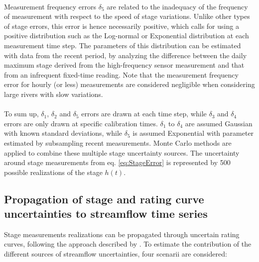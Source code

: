 \documentclass[11pt]{article}
\begin{document}
    \paragraph{}Measurement frequency errors $\delta_5$ are related to the inadequacy of the frequency of measurement with respect to the speed of stage variations. Unlike other types of stage errors, this error is hence necessarily positive, which calls for using a positive distribution such as the Log-normal or Exponential distribution at each measurement time step. The parameters of this distribution can be estimated with data from the recent period, by analyzing the difference between the daily maximum stage derived from the high-frequency sensor measurement and that from an infrequent fixed-time reading. Note that the measurement frequency error for hourly (or less) measurements are considered negligible when considering large rivers with slow variations. 
      
    \paragraph{}
    To sum up, $\delta_1$, $\delta_2$ and $\delta_5$ errors are drawn at each time step, while $\delta_3$ and $\delta_4$ errors are only drawn at specific calibration times. $\delta_1$ to $\delta_4$ are assumed Gaussian with known standard deviations, while $\delta_5$ is assumed Exponential with parameter estimated by subsampling recent measurements. Monte Carlo methods are applied to combine these multiple stage uncertainty sources. The uncertainty around stage measurements from eq. \ref{eq:StageError} is represented by 500 possible realizations of the stage $h(t)$.
   
   \subsection{Propagation of stage and rating curve uncertainties to streamflow time series}
   
   Stage measurements realizations can be propagated through uncertain rating curves, following the approach described by \citet{horner_impact_2018}. To estimate the contribution of the different sources of streamflow uncertainties, four scenarii are considered:
   
\end{document}
